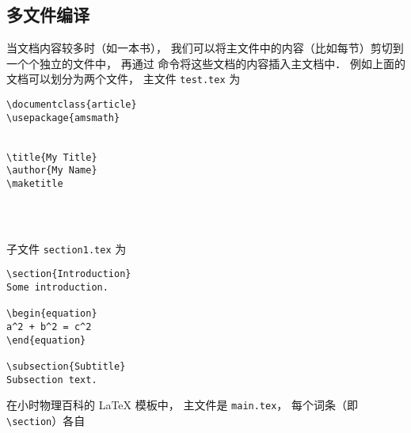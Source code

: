 \subsection{多文件编译}
当文档内容较多时（如一本书）， 我们可以将主文件中的内容（比如每节）剪切到一个个独立的文件中， 再通过 \lstinline|| 命令将这些文档的内容插入主文档中． 例如上面的文档可以划分为两个文件， 主文件 \lstinline|test.tex| 为
\begin{lstlisting}
\documentclass{article}
\usepackage{amsmath}


\title{My Title}
\author{My Name}
\maketitle




\end{lstlisting}

子文件 \lstinline|section1.tex| 为
\begin{lstlisting}
\section{Introduction}
Some introduction.

\begin{equation}
a^2 + b^2 = c^2
\end{equation}

\subsection{Subtitle}
Subsection text.
\end{lstlisting}

在小时物理百科的 LaTeX 模板中， 主文件是 \lstinline|main.tex|， 每个词条（即 \lstinline|\section|）各自
